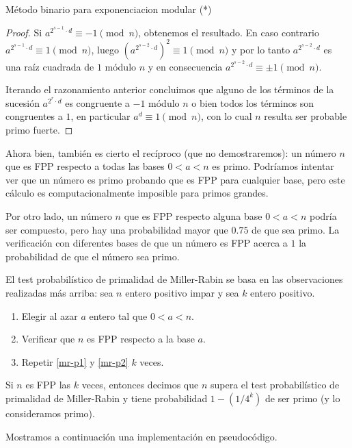 \begin{section}{Método binario para exponenciacion modular (*)}
\begin{proof}
     Si  $a^{2^{s-1} \cdot d} \equiv - 1 \pmod{n}$, obtenemos el resultado.  En caso contrario  $a^{2^{s-1} \cdot d} \equiv 1 \pmod{n}$,  luego $(a^{2^{s-2} \cdot d})^2 \equiv 1 \pmod{n}$ y por lo tanto $a^{2^{s-2} \cdot d}$ es una raíz cuadrada de $1$ módulo $n$ y en consecuencia  $a^{2^{s-2} \cdot d} \equiv \pm 1 \pmod{n}$. 

     Iterando el razonamiento anterior concluimos que alguno de los términos de la sucesión $ a^{2^{r} \cdot d}$  es congruente   a $-1$ módulo $n$ o bien todos los términos son congruentes a $1$,  en particular $a^{d} \equiv 1 \pmod{n}$, con lo cual $n$ resulta ser probable primo fuerte.   
\end{proof}


Ahora bien, también es cierto el recíproco (que no demostraremos): un número $n$ que es FPP respecto a todas las bases $ 0 < a < n$ es primo. Podríamos intentar ver que un número es primo  probando que es FPP para cualquier base, pero este cálculo es computacionalmente imposible para primos grandes.  

Por otro lado, un número $n$ que es FPP respecto alguna base $ 0 < a < n$ podría ser compuesto, pero hay una probabilidad mayor que $0.75$ de que sea primo. La verificación con diferentes bases de que un número es FPP acerca a $1$ la probabilidad de que el número sea primo.  

El test probabilístico de primalidad de Miller-Rabin se basa en las observaciones realizadas más arriba: sea $n$ entero positivo impar y sea $k$ entero positivo.  
\begin{enumerate}
    \item\label{mr-p1} Elegir al  azar $a$ entero tal que $0 < a < n$.
    \item\label{mr-p2} Verificar que  $n$ es FPP respecto a la base $a$.
    \item\label{mr-p3} Repetir \ref{mr-p1} y \ref{mr-p2} $k$ veces.
\end{enumerate}

Si $n$ es FPP las $k$ veces,  entonces decimos que $n$ supera el test probabilístico de primalidad de Miller-Rabin y tiene probabilidad $1 - ( 1 / 4^k)$ de ser primo (y lo consideramos primo).  

Mostramos a continuación una implementación en pseudocódigo. 



\end{section}
